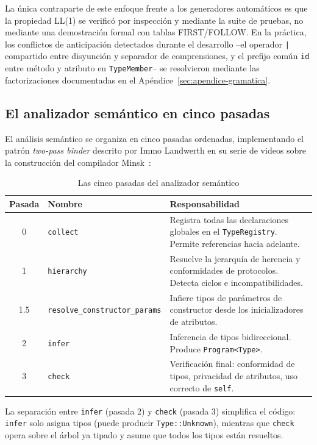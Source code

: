 \documentclass[12pt, a4paper]{article}
\begin{document}
La única contraparte de este enfoque frente a los generadores automáticos es que
la propiedad LL(1) se verificó por inspección y mediante la suite de pruebas, no
mediante una demostración formal con tablas FIRST/FOLLOW. En la práctica, los
conflictos de anticipación detectados durante el desarrollo --el operador
\texttt{|} compartido entre disyunción y separador de comprensiones, y el
prefijo común \texttt{id} entre método y atributo en \texttt{TypeMember}--
se resolvieron mediante las factorizaciones documentadas en el
Apéndice~\ref{sec:apendice-gramatica}.

\subsection{El analizador sem\'{a}ntico en cinco pasadas}

El an\'{a}lisis sem\'{a}ntico se organiza en cinco pasadas ordenadas, implementando el
patr\'{o}n \textit{two-pass binder} descrito por Immo Landwerth en su serie de
videos sobre la construcci\'{o}n del compilador Minsk~\cite{landwerth2019}:

\begin{table}[h!]
\centering
\caption{Las cinco pasadas del analizador sem\'{a}ntico}
\label{tab:passes}
\begin{tabularx}{\textwidth}{@{}clX@{}}
\toprule
\textbf{Pasada} & \textbf{Nombre} & \textbf{Responsabilidad} \\
\midrule
0 & \texttt{collect} & Registra todas las declaraciones globales en el
                       \texttt{TypeRegistry}. Permite referencias hacia adelante. \\
1 & \texttt{hierarchy} & Resuelve la jerarqu\'{i}a de herencia y conformidades de
                         protocolos. Detecta ciclos e incompatibilidades. \\
1.5 & \texttt{resolve\_constructor\_params} & Infiere tipos de par\'{a}metros de
                         constructor desde los inicializadores de atributos. \\
2 & \texttt{infer} & Inferencia de tipos bidireccional. Produce
                     \texttt{Program<Type>}. \\
3 & \texttt{check} & Verificaci\'{o}n final: conformidad de tipos, privacidad de
                     atributos, uso correcto de \texttt{self}. \\
\bottomrule
\end{tabularx}
\end{table}

La separaci\'{o}n entre \texttt{infer} (pasada 2) y \texttt{check} (pasada 3)
simplifica el c\'{o}digo: \texttt{infer} solo asigna tipos (puede producir
\texttt{Type::Unknown}), mientras que \texttt{check} opera sobre el \'{a}rbol ya
tipado y asume que todos los tipos est\'{a}n resueltos.
\end{document}
